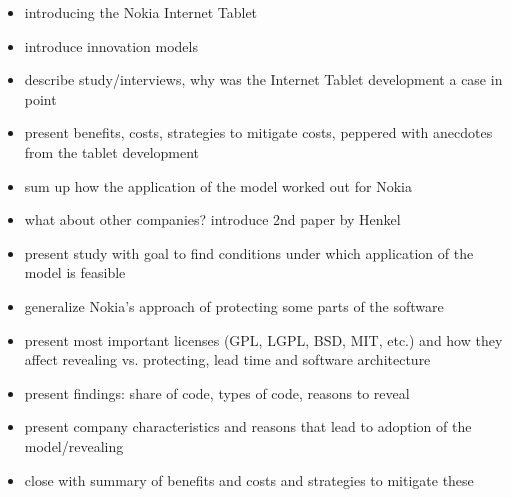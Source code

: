 \documentclass[a4paper]{scrartcl}
\begin{document}
\begin{itemize}
\item introducing the Nokia Internet Tablet
\item introduce innovation models
\item describe study/interviews, why was the Internet Tablet development a case in point
\item present benefits, costs, strategies to mitigate costs, peppered with anecdotes from the tablet development
\item sum up how the application of the model worked out for Nokia
\item what about other companies? introduce 2nd paper by Henkel
\item present study with goal to find conditions under which application of the model is feasible
\item generalize Nokia's approach of protecting some parts of the software
\item present most important licenses (GPL, LGPL, BSD, MIT, etc.) and how they affect revealing vs. protecting, lead time and software architecture
\item present findings: share of code, types of code, reasons to reveal
\item present company characteristics and reasons that lead to adoption of the model/revealing
\item close with summary of benefits and costs and strategies to mitigate these
\end{itemize}

\printbibliography[keyword=innovation]
\end{document}
